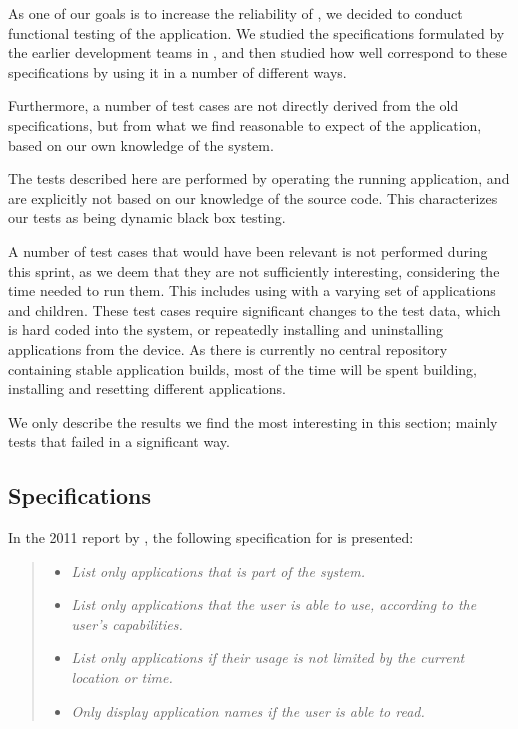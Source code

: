As one of our goals is to increase the reliability of \launcher, we decided to conduct functional testing of the application.
We studied the specifications formulated by the earlier development teams in \citet{launcher2011,launcher2012}, and then studied how well \launcher correspond to these specifications by using it in a number of different ways. 

Furthermore, a number of test cases are not directly derived from the old specifications, but from what we find reasonable to expect of the application, based on our own knowledge of the system.

The tests described here are performed by operating the running application, and are explicitly not based on our knowledge of the source code. 
This characterizes our tests as being dynamic black box testing. 

A number of test cases that would have been relevant is not performed during this sprint, as we deem that they are not sufficiently interesting, considering the time needed to run them. 
This includes using \launcher with a varying set of applications and children.
These test cases require significant changes to the test data, which is hard coded into the \giraf system, or repeatedly installing and uninstalling applications from the device.
As there is currently no central repository containing stable application builds, most of the time will be spent building, installing and resetting different applications.

We only describe the results we find the most interesting in this section; mainly tests that failed in a significant way.

\subsection{Specifications}
In the 2011 report by \citet{launcher2011}, the following specification for \launcher is presented:

\begin{quote}
\begin{itemize}
	\item \textit{List only applications that is part of the \giraf system.}
	\item \textit{List only applications that the user is able to use, according to the user's capabilities.}
	\item \textit{List only applications if their usage is not limited by the current location or time.}
	\item \textit{Only display application names if the user is able to read.}
\end{itemize}
\end{quote}

